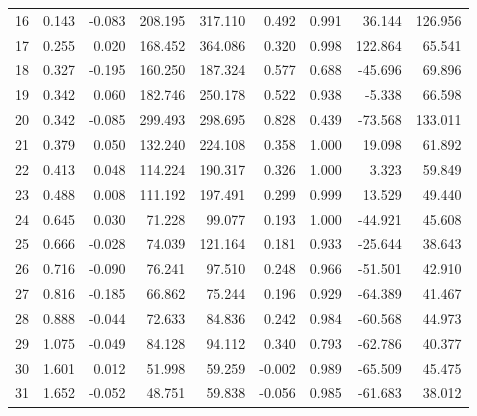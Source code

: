 \begin{tabular}{rrrrrrrrr}
      16 &  0.143 & -0.083 &  208.195 &  317.110 &       0.492 &                0.991 &           36.144 &   126.956 \\
      17 &  0.255 &  0.020 &  168.452 &  364.086 &       0.320 &                0.998 &          122.864 &    65.541 \\
      18 &  0.327 & -0.195 &  160.250 &  187.324 &       0.577 &                0.688 &          -45.696 &    69.896 \\
      19 &  0.342 &  0.060 &  182.746 &  250.178 &       0.522 &                0.938 &           -5.338 &    66.598 \\
      20 &  0.342 & -0.085 &  299.493 &  298.695 &       0.828 &                0.439 &          -73.568 &   133.011 \\
      21 &  0.379 &  0.050 &  132.240 &  224.108 &       0.358 &                1.000 &           19.098 &    61.892 \\
      22 &  0.413 &  0.048 &  114.224 &  190.317 &       0.326 &                1.000 &            3.323 &    59.849 \\
      23 &  0.488 &  0.008 &  111.192 &  197.491 &       0.299 &                0.999 &           13.529 &    49.440 \\
      24 &  0.645 &  0.030 &   71.228 &   99.077 &       0.193 &                1.000 &          -44.921 &    45.608 \\
      25 &  0.666 & -0.028 &   74.039 &  121.164 &       0.181 &                0.933 &          -25.644 &    38.643 \\
      26 &  0.716 & -0.090 &   76.241 &   97.510 &       0.248 &                0.966 &          -51.501 &    42.910 \\
      27 &  0.816 & -0.185 &   66.862 &   75.244 &       0.196 &                0.929 &          -64.389 &    41.467 \\
      28 &  0.888 & -0.044 &   72.633 &   84.836 &       0.242 &                0.984 &          -60.568 &    44.973 \\
      29 &  1.075 & -0.049 &   84.128 &   94.112 &       0.340 &                0.793 &          -62.786 &    40.377 \\
      30 &  1.601 &  0.012 &   51.998 &   59.259 &      -0.002 &                0.989 &          -65.509 &    45.475 \\
      31 &  1.652 & -0.052 &   48.751 &   59.838 &      -0.056 &                0.985 &          -61.683 &    38.012 \\
\bottomrule
\end{tabular}
